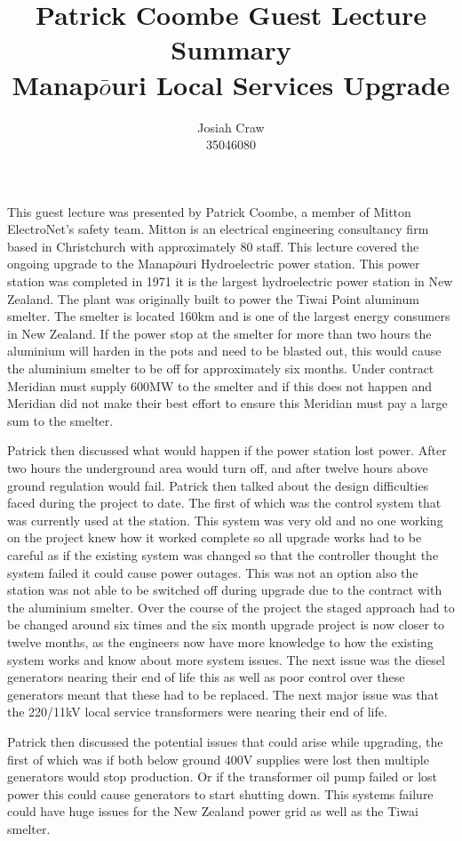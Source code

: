 \documentclass{article}
\title{Patrick Coombe Guest Lecture Summary\\Manap$\bar{o}$uri Local Services Upgrade}
\author{Josiah Craw\\35046080}
\begin{document}
\maketitle

This guest lecture was presented by Patrick Coombe, a member of Mitton ElectroNet's safety team.
Mitton is an electrical engineering consultancy firm based in Christchurch with approximately 80
staff. This lecture covered the ongoing upgrade to the Manap$\bar{o}$uri Hydroelectric power
station. This power station was completed in 1971 it is the largest hydroelectric power station in
New Zealand. The plant was originally built to power the Tiwai Point aluminum smelter. The smelter
is located 160km and is one of the largest energy consumers in New Zealand. If the power stop at
the smelter for more than two hours the aluminium will harden in the pots and need to be blasted
out, this would cause the aluminium smelter to be off for approximately six months. Under contract
Meridian must supply 600MW to the smelter and if this does not happen and Meridian did not make
their best effort to ensure this Meridian must pay a large sum to the smelter.

Patrick then discussed what would happen if the power station lost power. After two hours the 
underground area would turn off, and after twelve hours above ground regulation would fail.
Patrick then talked about the design difficulties faced during the project to date. The first of
which was the control system that was currently used at the station. This system was very old and
no one working on the project knew how it worked complete so all upgrade works had to be careful
as if the existing system was changed so that the controller thought the system failed it could
cause power outages. This was not an option also the station was not able to be switched off
during upgrade due to the contract with the aluminium smelter. Over the course of the project the
staged approach had to be changed around six times and the six month upgrade project is now closer
to twelve months, as the engineers now have more knowledge to how the existing system works and
know about more system issues. The next issue was the diesel generators nearing their end of life
this as well as poor control over these generators meant that these had to be replaced. The next
major issue was that the 220/11kV local service transformers were nearing their end of life.

Patrick then discussed the potential issues that could arise while upgrading, the first of which
was if both below ground 400V supplies were lost then multiple generators would stop production.
Or if the transformer oil pump failed or lost power this could cause generators to start shutting
down. This systems failure could have huge issues for the New Zealand power grid as well as the
Tiwai smelter.
\end{document}
